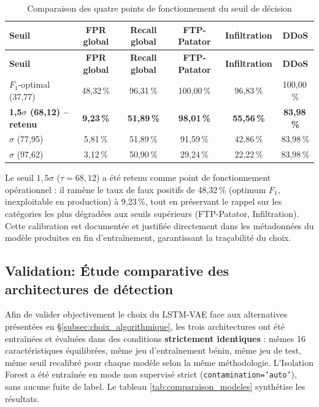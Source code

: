 \renewcommand{\arraystretch}{1.25}
\small
\begin{xltabular}{\textwidth}{|>{\centering\arraybackslash}X|c|c|c|c|c|}

\caption{Comparaison des quatre points de fonctionnement du seuil de décision}
\label{tab:comparaison_seuils} \\

\hline
{}
\textbf{Seuil} & \textbf{FPR global} & \textbf{Recall global} & \textbf{FTP-Patator} & \textbf{Infiltration} & \textbf{DDoS} \\ \hline
\endfirsthead

\hline
{}
\textbf{Seuil} & \textbf{FPR global} & \textbf{Recall global} & \textbf{FTP-Patator} & \textbf{Infiltration} & \textbf{DDoS} \\ \hline
\endhead

$F_1$-optimal (37,77) & 48,32\,\% & 96,31\,\% & 100,00\,\% & 96,83\,\% & 100,00\,\% \\ \hline
\textbf{1,5$\sigma$ (68,12) -- retenu} & \textbf{9,23\,\%} & \textbf{51,89\,\%} & \textbf{98,01\,\%} & \textbf{55,56\,\%} & \textbf{83,98\,\%} \\ $\sigma$ (77,95) & 5,81\,\% & 51,89\,\% & 91,59\,\% & 42,86\,\% & 83,98\,\% \\ $\sigma$ (97,62) & 3,12\,\% & 50,90\,\% & 29,24\,\% & 22,22\,\% & 83,98\,\% \\ \hline

\end{xltabular}
\newpage
Le seuil $1,5\sigma$ ($\tau = 68,12$) a été retenu comme point de fonctionnement opérationnel : il ramène le taux de faux positifs de 48,32\,\% (optimum $F_1$, inexploitable en production) à 9,23\,\%, tout en préservant le rappel sur les catégories les plus dégradées aux seuils supérieurs (FTP-Patator, Infiltration). Cette calibration est documentée et justifiée directement dans les métadonnées du modèle produites en fin d'entraînement, garantissant la traçabilité du choix.

\subsection{Validation: Étude comparative des architectures de détection}
\label{subsec:etude_comparative}
Afin de valider objectivement le choix du LSTM-VAE face aux alternatives présentées en \S\ref{subsec:choix_algorithmique}, les trois architectures ont été entraînées et évaluées dans des conditions \textbf{strictement identiques} : mêmes 16 caractéristiques équilibrées, même jeu d'entraînement bénin, même jeu de test, même seuil recalibré pour chaque modèle selon la même méthodologie. L'Isolation Forest a été entraînée en mode non supervisé strict (\texttt{contamination='auto'}), sans aucune fuite de label. Le tableau \ref{tab:comparaison_modeles} synthétise les résultats.

